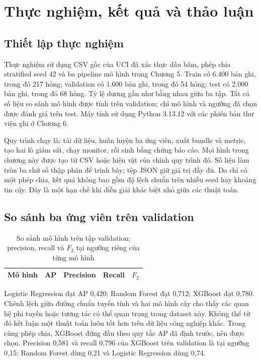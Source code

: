 \chapter{Thực nghiệm, kết quả và thảo luận}
\section{Thiết lập thực nghiệm}
Thực nghiệm sử dụng CSV gốc của UCI đã xác thực dấu băm, phép chia stratified seed 42 và ba pipeline mô hình trong Chương 5. Train có 6.400 bản ghi, trong đó 217 hỏng; validation có 1.600 bản ghi, trong đó 54 hỏng; test có 2.000 bản ghi, trong đó 68 hỏng. Tỷ lệ dương gần như bằng nhau giữa ba tập. Tất cả số liệu so sánh mô hình được tính trên validation; chỉ mô hình và ngưỡng đã chọn được đánh giá trên test. Máy tính sử dụng Python 3.13.12 với các phiên bản thư viện ghi ở Chương 6.

Quy trình chạy là: tải dữ liệu, huấn luyện ba ứng viên, xuất bundle và metric, tạo hai lô giám sát, chạy monitor, rồi sinh bằng chứng báo cáo. Mọi hình trong chương này được tạo từ CSV hoặc hiện vật của chính quy trình đó. Số liệu làm tròn ba chữ số thập phân để trình bày; tệp JSON giữ giá trị đầy đủ. Do chỉ có một phép chia, kết quả không bao gồm độ lệch chuẩn trên nhiều seed hay khoảng tin cậy. Đây là một hạn chế khi diễn giải khác biệt nhỏ giữa các thuật toán.

\section{So sánh ba ứng viên trên validation}
\begin{table}[H]\centering\caption{So sánh mô hình trên tập validation; precision, recall và $F_2$ tại ngưỡng riêng của từng mô hình}\label{tab:validation}
\begin{tabular}{lrrrr}\toprule Mô hình & AP & Precision & Recall & $F_2$\\\midrule

\end{tabular}\end{table}
Logistic Regression đạt AP 0,420; Random Forest đạt 0,712; XGBoost đạt 0,780. Chênh lệch giữa đường chuẩn tuyến tính và hai mô hình cây cho thấy các quan hệ phi tuyến hoặc tương tác có thể quan trọng trong dataset này. Không thể từ đó kết luận một thuật toán luôn tốt hơn trên dữ liệu công nghiệp khác. Trong cùng phép chia, XGBoost đứng đầu theo quy tắc AP đã định trước, nên được chọn. Precision 0,581 và recall 0,796 của XGBoost trên validation là tại ngưỡng 0,15; Random Forest dùng 0,21 và Logistic Regression dùng 0,74.

